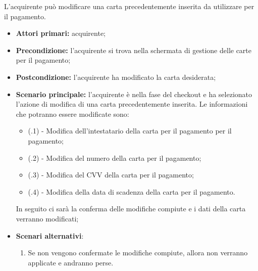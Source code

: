 L'acquirente può modificare una carta precedentemente inserita da utilizzare per il pagamento.
\begin{itemize}
    \item \textbf{Attori primari:} acquirente;
    \item \textbf{Precondizione:} l'acquirente si trova nella schermata di gestione delle carte per il pagamento;
    \item \textbf{Postcondizione:} l'acquirente ha modificato la carta desiderata;
    \item \textbf{Scenario principale:} l'acquirente è nella fase del checkout e ha selezionato l'azione di modifica di una carta precedentemente inserita. Le informazioni che potranno essere modificate sono:
    \begin{itemize}
        \item (\actualUC.1) - Modifica dell'intestatario della carta per il pagamento per il pagamento;
        \item (\actualUC.2) - Modifica del numero della carta per il pagamento;
        \item (\actualUC.3) - Modifica del CVV della carta per il pagamento;
        \item (\actualUC.4) - Modifica della data di scadenza della carta per il pagamento.
    \end{itemize}
    In seguito ci sarà la conferma delle modifiche compiute e i dati della carta verranno modificati;
    \item \textbf{Scenari alternativi}:
    \begin{enumerate}[label=\lett]
        \item Se non vengono confermate le modifiche compiute, allora non verranno applicate e andranno perse.
    \end{enumerate}
\end{itemize}

\resetSubUC

